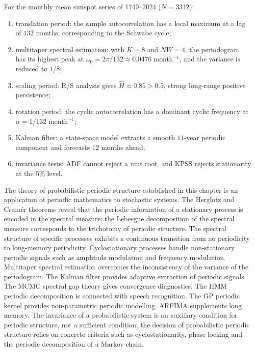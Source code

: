\begin{example}\label{ex:sunspot_diagnosis}
For the monthly mean sunspot series of 1749--2024 ($N=3312$):
\begin{enumerate}[label=(\roman*)]
    \item translation period: the sample autocorrelation has a local maximum at a lag of $132$ months, corresponding to the Schwabe cycle;
    \item multitaper spectral estimation: with $K=8$ and $NW=4$, the periodogram has its highest peak at $\omega_0=2\pi/132\approx0.0476$ month$^{-1}$, and the variance is reduced to $1/8$;
    \item scaling period: R/S analysis gives $\hat H\approx0.85>0.5$, strong long-range positive persistence;
    \item rotation period: the cyclic autocorrelation has a dominant cyclic frequency at $\alpha=1/132$ month$^{-1}$;
    \item Kalman filter: a state-space model extracts a smooth $11$-year periodic component and forecasts $12$ months ahead;
    \item invariance tests: ADF cannot reject a unit root, and KPSS rejects stationarity at the $5\%$ level.
\end{enumerate}
\end{example}

\begin{remark}\label{rem:prob_book_interface}
The theory of probabilistic periodic structure established in this chapter is an application of periodic mathematics to stochastic systems. The Herglotz and Cramér theorems reveal that the periodic information of a stationary process is encoded in the spectral measure; the Lebesgue decomposition of the spectral measure corresponds to the trichotomy of periodic structure. The spectral structure of specific processes exhibits a continuous transition from no periodicity to long-memory periodicity. Cyclostationary processes handle non-stationary periodic signals such as amplitude modulation and frequency modulation. Multitaper spectral estimation overcomes the inconsistency of the variance of the periodogram. The Kalman filter provides adaptive extraction of periodic signals. The MCMC spectral gap theory gives convergence diagnostics. The HMM periodic decomposition is connected with speech recognition. The GP periodic kernel provides non-parametric periodic modelling. ARFIMA supplements long memory. The invariance of a probabilistic system is an auxiliary condition for periodic structure, not a sufficient condition; the decision of probabilistic periodic structure relies on concrete criteria such as cyclostationarity, phase locking and the periodic decomposition of a Markov chain.
\end{remark}

